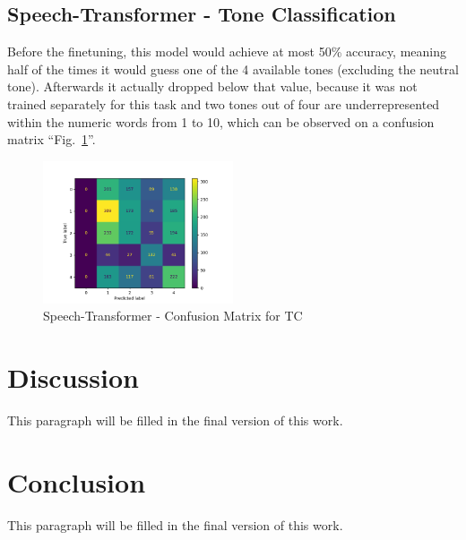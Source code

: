 \documentclass[conference]{IEEEtran}
\begin{document}
\subsection{Speech-Transformer - Tone Classification}
Before the finetuning, this model would achieve at most 50\% accuracy, meaning half of the times it would guess one of the 4 available tones (excluding the neutral tone).
Afterwards it actually dropped below that value, because it was not trained separately for this task and two tones out of four are underrepresented within the numeric words from 1 to 10, which can be observed on a confusion matrix ``Fig.~\ref{fig_STTC}''.

\begin{figure}[hbtp]
    \centerline{\includegraphics[width=0.5\textwidth]{Figures/Fig_STTC.png}}
    \caption{Speech-Transformer - Confusion Matrix for TC}
    \label{fig_STTC}
\end{figure}

\section{Discussion}
This paragraph will be filled in the final version of this work.

\section{Conclusion}
This paragraph will be filled in the final version of this work.
\end{document}
